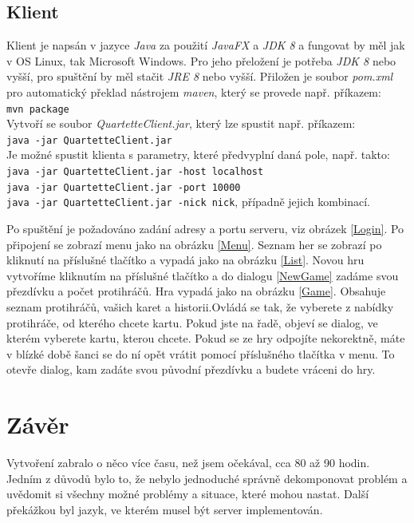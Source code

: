 \documentclass[12pt, a4paper]{article}
\begin{document}
		\subsection{Klient}
		Klient je napsán v jazyce \emph{Java} za použití \emph{JavaFX} a \emph{JDK 8} a fungovat by měl jak v OS Linux, tak Microsoft Windows. Pro jeho přeložení je potřeba \emph{JDK 8} nebo vyšší, pro spuštění by měl stačit \emph{JRE 8} nebo vyšší. Přiložen je soubor \emph{pom.xml} pro automatický překlad nástrojem \emph{maven}, který se provede např. příkazem:\\
		\texttt{mvn package}\\
		Vytvoří se soubor \emph{QuartetteClient.jar}, který lze spustit např. příkazem:\\
		\texttt{java -jar QuartetteClient.jar}\\
		Je možné spustit klienta s parametry, které předvyplní daná pole, např. takto:\\
		\texttt{java -jar QuartetteClient.jar -host localhost}\\
		\texttt{java -jar QuartetteClient.jar -port 10000}\\
		\texttt{java -jar QuartetteClient.jar -nick nick}, případně jejich kombinací.
		
		Po spuštění je požadováno zadání adresy a portu serveru, viz obrázek \ref{Login}. Po připojení se zobrazí menu jako na obrázku \ref{Menu}. Seznam her se zobrazí po kliknutí na příslušné tlačítko a vypadá jako na obrázku \ref{List}. Novou hru vytvoříme kliknutím na příslušné tlačítko a do dialogu \ref{NewGame} zadáme svou přezdívku a počet protihráčů. Hra vypadá jako na obrázku \ref{Game}. Obsahuje seznam protihráčů, vašich karet a historii.Ovládá se tak, že vyberete z nabídky protihráče, od kterého chcete kartu. Pokud jste na řadě, objeví se dialog, ve kterém vyberete kartu, kterou chcete. Pokud se ze hry odpojíte nekorektně, máte v blízké době šanci se do ní opět vrátit pomocí příslušného tlačítka v menu. To otevře dialog, kam zadáte svou původní přezdívku a budete vráceni do hry.
		
	\section{Závěr}
	Vytvoření zabralo o něco více času, než jsem očekával, cca 80 až 90 hodin. Jedním z důvodů bylo to, že nebylo jednoduché správně dekomponovat problém a uvědomit si všechny možné problémy a situace, které mohou nastat. Další překážkou byl jazyk, ve kterém musel být server implementován.
	
\end{document}
